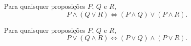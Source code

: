 \documentclass[../../main]{subfiles}
\begin{document}
\begin{prop}
	\label{prop:matematica:logica-matematica:logica-proposicional:distributividade-da-conjuncao-sobre-a-disjuncao}

	Para quaisquer proposições \(P\), \(Q\) e \(R\),
	\begin{equation*}
		P\land(Q\lor R) \Leftrightarrow (P\land Q)\lor(P\land R).
	\end{equation*}
\end{prop}

\begin{prop}
	\label{prop:matematica:logica-matematica:logica-proposicional:distributividade-da-disjuncao-sobre-a-conjuncao}

	Para quaisquer proposições \(P\), \(Q\) e \(R\),
	\begin{equation*}
		P\lor(Q\land R) \Leftrightarrow (P\lor Q)\land(P\lor R).
	\end{equation*}
\end{prop}
\end{document}
